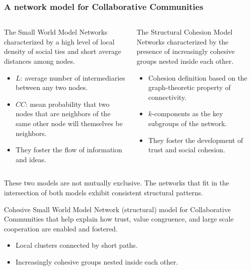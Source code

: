 \documentclass[ignorenonframetext,red,8pt,notes=show]{beamer}
\begin{document}
\begin{frame}
\frametitle{A network model for Collaborative Communities}

\begin{columns}[c]
\begin{column}{0.5\textwidth}
\begin{block}{The Small World Model}
Networks characterized by a high level of local density of social ties and short average distances among nodes.

\begin{itemize}
\item $L$: average number of intermediaries between any two nodes.
\item $CC$: mean probability that two nodes that are neighbors of the same other node will themselves be neighbors.
\item They foster the flow of information and ideas.

\end{itemize}
\end{block}
\end{column}

\begin{column}{0.5\textwidth}
\begin{block}{The Structural Cohesion Model}
Networks characterized by the presence of increasingly cohesive groups nested inside each other. 
\begin{itemize}
\item Cohesion definition based on the graph-theoretic property of connectivity.
\item $k$-components as the key subgroups of the network.
\item They foster the development of trust and social cohesion.
\end{itemize}
\end{block}
\end{column}

\end{columns}

These two models are not mutually exclusive. The networks that fit in the intersection of both models exhibit consistent structural patterns.

\begin{block}{Cohesive Small World Model}
Network (structural) model for Collaborative Communities that help explain how trust, value congruence, and large scale cooperation are enabled and fostered.

\begin{itemize}
\item Local clusters connected by short paths.
\item Increasingly cohesive groups nested inside each other.
\end{itemize}
\end{block}


\end{frame}
\end{document}
